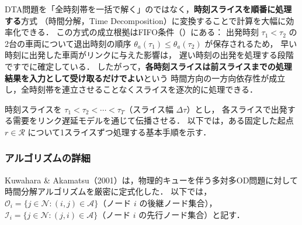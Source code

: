 DTA問題を「全時刻帯を一括で解く」のではなく，\textbf{時刻スライスを順番に処理する}方式
（時間分解，Time Decomposition）に変換することで計算を大幅に効率化できる\cite{KuwaharaAkamatsu2001}．
この方式の成立根拠はFIFO条件（）にある：
出発時刻 $\tau_1 < \tau_2$ の2台の車両について退出時刻の順序
$\theta_a(\tau_1) \leq \theta_a(\tau_2)$ が保存されるため，
早い時刻に出発した車両がリンクに与えた影響は，
遅い時刻の出発を処理する段階ですでに確定している．
したがって，\textbf{各時刻スライスは前スライスまでの処理結果を入力として受け取るだけでよい}という
時間方向の一方向依存性が成立し，全時刻帯を連立させることなくスライスを逐次的に処理できる．

時刻スライスを $\tau_1 < \tau_2 < \cdots < \tau_T$（スライス幅 $\Delta\tau$）とし，
各スライスで出発する需要をリンク遅延モデルを通じて伝播させる．
以下では，ある固定した起点 $r \in \mathcal{R}$ について1スライスずつ処理する基本手順を示す．

\subsubsection*{アルゴリズムの詳細}

Kuwahara \& Akamatsu（2001）は，物理的キューを伴う多対多OD問題に対して
時間分解アルゴリズムを厳密に定式化した\cite{KuwaharaAkamatsu2001}．
以下では，$\mathcal{O}_i = \{j \in \mathcal{N}: (i,j) \in \mathcal{A}\}$（ノード $i$ の後継ノード集合），
$\mathcal{I}_i = \{j \in \mathcal{N}: (j,i) \in \mathcal{A}\}$（ノード $i$ の先行ノード集合）と記す．

